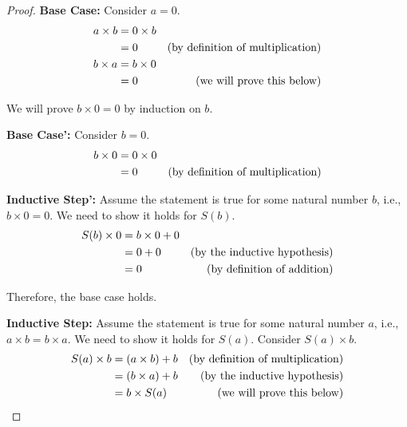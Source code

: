 \documentclass[10pt]{article}
\newenvironment{problem}[2][Problem]{\begin{trivlist}
\item[\hskip \labelsep {\bfseries #1}\hskip \labelsep {\bfseries #2.}]}{\end{trivlist}}
\begin{document}
\begin{problem}{1}
\begin{enumerate}
\begin{enumerate}
\begin{proof}
                        \textbf{Base Case:} Consider \( a = 0 \).
                        \begin{align*}
                            a \times b &= 0 \times b \\
                                       &= 0 & \text{(by definition of multiplication)} \hfill \\
                            b \times a &= b \times 0 \\
                                       &= 0 & \text{(we will prove this below)} \hfill
                        \end{align*}

                        We will prove \( b \times 0 = 0 \) by induction on \( b \).

                        \textbf{Base Case':} Consider \( b = 0 \).
                        \begin{align*}
                            b \times 0 &= 0 \times 0 \\
                                       &= 0 & \text{(by definition of multiplication)} \hfill
                        \end{align*}

                        \textbf{Inductive Step':} Assume the statement is true for some natural number \( b \), i.e., \( b \times 0 = 0 \). We need to show it holds for \( S(b) \).
                        \begin{align*}
                            S(b) \times 0 &= b \times 0 + 0 \\
                                          &= 0 + 0 & \text{(by the inductive hypothesis)} \hfill \\
                                          &= 0 & \text{(by definition of addition)} \hfill
                        \end{align*}

                        Therefore, the base case holds.

                        \textbf{Inductive Step:} Assume the statement is true for some natural number \( a \), i.e., \( a \times b = b \times a \). We need to show it holds for \( S(a) \).
                        Consider \( S(a) \times b \).
                        \begin{align*}
                            S(a) \times b &= (a \times b) + b & \text{(by definition of multiplication)} \hfill \\
                                          &= (b \times a) + b & \text{(by the inductive hypothesis)} \hfill \\
                                          &= b \times S(a) & \text{(we will prove this below)} \hfill
                        \end{align*}


\end{proof}
\end{enumerate}
\end{enumerate}
\end{problem}
\end{document}
